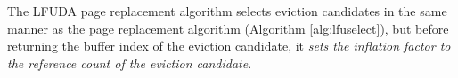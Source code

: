    The LFUDA page replacement algorithm selects eviction candidates in the same manner as the  page replacement algorithm (Algorithm \ref{alg:lfuselect}), but before returning the buffer index of the eviction candidate, it \emph{sets the inflation factor to the reference count of the eviction candidate}.














